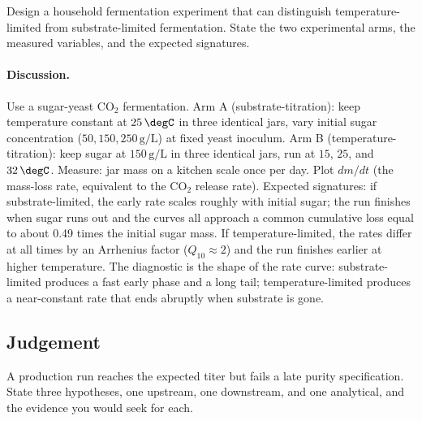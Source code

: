 \begin{exercise}
Design a household fermentation experiment that can distinguish
temperature-limited from substrate-limited fermentation. State the two
experimental arms, the measured variables, and the expected signatures.
\end{exercise}

\paragraph{Discussion.}
Use a sugar-yeast CO$_2$ fermentation. Arm A (substrate-titration):
keep temperature constant at $25\,\degC$ in three identical jars,
vary initial sugar concentration ($50, 150, 250\,\text{g/L}$) at fixed
yeast inoculum. Arm B (temperature-titration): keep sugar at
$150\,\text{g/L}$ in three identical jars, run at $15$, $25$, and
$32\,\degC$. Measure: jar mass on a kitchen scale once per day. Plot
$dm/dt$ (the mass-loss rate, equivalent to the CO$_2$ release rate).
Expected signatures: if substrate-limited, the early rate scales
roughly with initial sugar; the run finishes when sugar runs out and
the curves all approach a common cumulative loss equal to about 0.49
times the initial sugar mass. If temperature-limited, the rates
differ at all times by an Arrhenius factor ($Q_{10} \approx 2$) and
the run finishes earlier at higher temperature. The diagnostic is the
shape of the rate curve: substrate-limited produces a fast early
phase and a long tail; temperature-limited produces a near-constant
rate that ends abruptly when substrate is gone.

\subsection*{Judgement}

\begin{exercise}
A production run reaches the expected titer but fails a late
purity specification. State three hypotheses, one upstream, one
downstream, and one analytical, and the evidence you would seek for
each.
\end{exercise}

